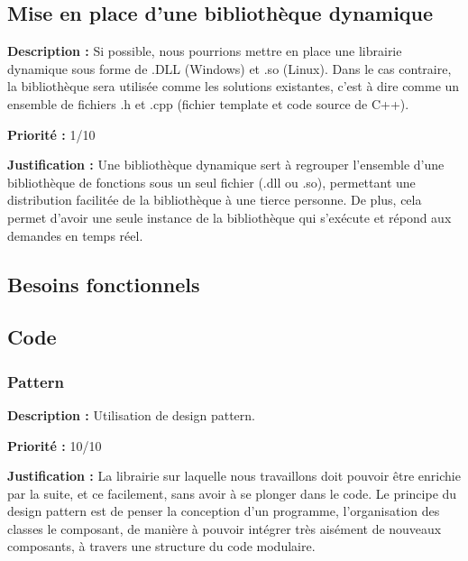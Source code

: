 \begin{titlepage}
\subsection{Mise en place d'une bibliothèque dynamique}
{
\textbf{Description :} Si possible, nous pourrions mettre en place une librairie dynamique sous forme de .DLL (Windows) et .so (Linux). \cite{dll1}\cite{dll2}\cite{dll3} Dans le cas contraire, la bibliothèque sera utilisée comme les solutions existantes, c'est à dire comme un ensemble de fichiers .h et .cpp (fichier template et code source de C++).

\textbf{Priorité :} 1/10

\textbf{Justification :} Une bibliothèque dynamique sert à regrouper l'ensemble d'une bibliothèque de fonctions sous un seul fichier (.dll ou .so), permettant une distribution facilitée de la bibliothèque à une tierce personne. De plus, cela permet d'avoir une seule instance de la bibliothèque qui s'exécute et répond aux demandes en temps réel.
}


\newpage
\begin{center}
\begin{bf}
\section{Besoins fonctionnels}
\end{bf}
\end{center}

\subsection{Code}

\subsubsection{Pattern}
{
\textbf{Description :} Utilisation de design pattern.

\textbf{Priorité :} 10/10

\textbf{Justification :} La librairie sur laquelle nous travaillons doit pouvoir être enrichie par la suite, et ce facilement, sans avoir à se plonger dans le code. Le principe du design pattern est de penser la conception d'un programme, l'organisation des classes le composant, de manière à pouvoir intégrer très aisément de nouveaux composants, à travers une structure du code modulaire.
}


\end{titlepage}
